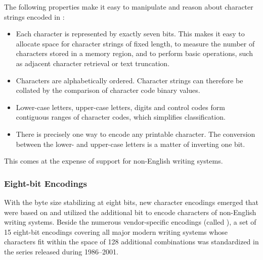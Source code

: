 \documentclass{book}
\begin{document}

The following properties make it easy to manipulate and reason about character
strings encoded in :
\begin{itemize}
  \item Each character is represented by exactly seven bits. This makes it easy
    to allocate space for character strings of fixed length, to measure the
    number of characters stored in a memory region, and to perform basic
    operations, such as adjacent character retrieval or text truncation.
  \item Characters are alphabetically ordered. Character strings can therefore
    be collated by the comparison of character code binary values.
  \item Lower-case letters, upper-case letters, digits and control codes form
    contiguous ranges of character codes, which simplifies classification.
  \item There is precisely one way to encode any printable character. The
    conversion between the lower- and upper-case letters is a matter of
    inverting one bit.
\end{itemize}
This comes at the expense of support for non-English writing systems.

\subsubsection{Eight-bit Encodings}
With the byte size stabilizing at eight bits, new character encodings emerged
that were based on  and utilized the additional bit to encode
characters of non-English writing systems. Beside the numerous vendor-specific
encodings (called ), a set of 15 eight-bit encodings
covering all major modern writing systems whose characters fit within the space
of 128 additional combinations was standardized in the
 series released during 1986--2001.
\end{document}
